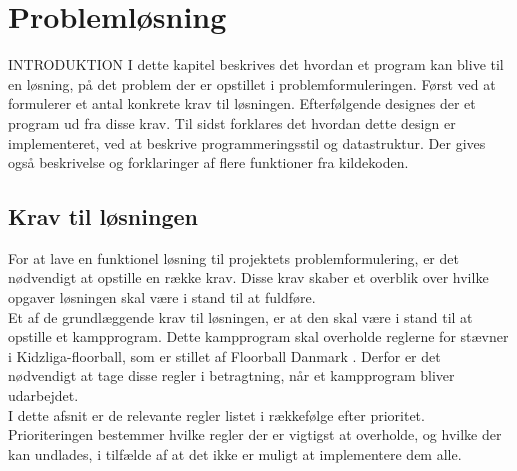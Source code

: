 \chapter{Problemløsning}\label{ch:chlabel}

INTRODUKTION
I dette kapitel beskrives det hvordan et program kan blive til en løsning, på det problem der er opstillet i problemformuleringen. Først ved at formulerer et antal konkrete krav til løsningen. Efterfølgende designes der et program ud fra disse krav. Til sidst
forklares det hvordan dette design er implementeret, ved at beskrive programmeringsstil og datastruktur. Der gives også beskrivelse og forklaringer af flere funktioner fra kildekoden.

\section{Krav til løsningen}
For at lave en funktionel løsning til projektets problemformulering, er det nødvendigt at opstille en række krav. Disse krav skaber et overblik over hvilke opgaver løsningen skal være i stand til at fuldføre.
\\
Et af de grundlæggende krav til løsningen, er at den skal være i stand til at opstille et kampprogram. Dette kampprogram skal overholde reglerne for stævner i Kidzliga-floorball, som er stillet af Floorball Danmark \cite{kidzRegler}. Derfor er det nødvendigt at tage disse regler i betragtning, når et kampprogram bliver udarbejdet.\\
I dette afsnit er de relevante regler listet i rækkefølge efter prioritet. Prioriteringen bestemmer hvilke regler der er vigtigst at overholde, og hvilke der kan undlades, i tilfælde af at det ikke er muligt at implementere dem alle.
